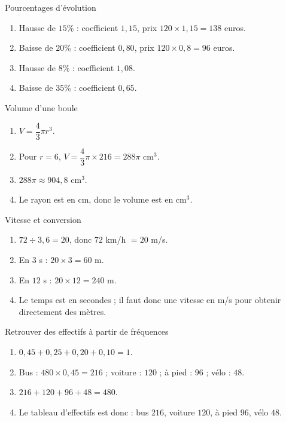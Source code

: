 \documentclass[11pt,a4paper]{article}
\newcounter{corr}
\begin{document}
\begin{corrbox}{Pourcentages d'évolution}
\begin{enumerate}
\item Hausse de $15\%$ : coefficient $1{,}15$, prix $120\times1{,}15=138$ euros.
\item Baisse de $20\%$ : coefficient $0{,}80$, prix $120\times0{,}8=96$ euros.
\item Hausse de $8\%$ : coefficient $1{,}08$.
\item Baisse de $35\%$ : coefficient $0{,}65$.
\end{enumerate}
\end{corrbox}

\begin{corrbox}{Volume d'une boule}
\begin{enumerate}
\item $V=\dfrac43\pi r^3$.
\item Pour $r=6$, $V=\dfrac43\pi\times216=288\pi$ cm$^3$.
\item $288\pi\approx904{,}8$ cm$^3$.
\item Le rayon est en cm, donc le volume est en cm$^3$.
\end{enumerate}
\end{corrbox}

\begin{corrbox}{Vitesse et conversion}
\begin{enumerate}
\item $72\div3{,}6=20$, donc $72$ km/h $=20$ m/s.
\item En $3$ s : $20\times3=60$ m.
\item En $12$ s : $20\times12=240$ m.
\item Le temps est en secondes ; il faut donc une vitesse en m/s pour obtenir directement des mètres.
\end{enumerate}
\end{corrbox}

\begin{corrbox}{Retrouver des effectifs à partir de fréquences}
\begin{enumerate}
\item $0{,}45+0{,}25+0{,}20+0{,}10=1$.
\item Bus : $480\times0{,}45=216$ ; voiture : $120$ ; à pied : $96$ ; vélo : $48$.
\item $216+120+96+48=480$.
\item Le tableau d'effectifs est donc : bus $216$, voiture $120$, à pied $96$, vélo $48$.
\end{enumerate}
\end{corrbox}
\end{document}
